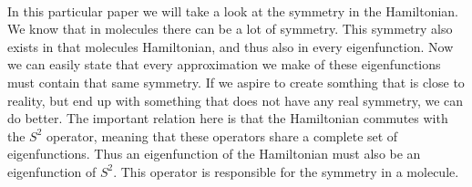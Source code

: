 \documentclass[twoside,twocolumn,9pt]{article}
\begin{document}
\paragraph*{}
In this particular paper we will take a look at the symmetry in the Hamiltonian. We know that in molecules there can be a lot of symmetry.
This symmetry also exists in that molecules Hamiltonian, and thus also in every eigenfunction. Now we can easily state that every 
approximation we make of these eigenfunctions must contain that same symmetry. If we aspire to create somthing that is close to reality,
but end up with something that does not have any real symmetry, we can do better. The important relation here is that the Hamiltonian 
commutes with the $S^2$ operator, meaning that these operators share a complete set of eigenfunctions. Thus an eigenfunction of the Hamiltonian must also
be an eigenfunction of $S^2$. This operator is responsible for the symmetry in a molecule.
\end{document}
